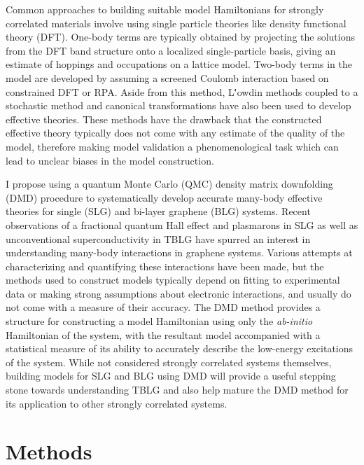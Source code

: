 \documentclass[12pt]{article}
\begin{document}
Common approaches to building suitable model Hamiltonians for strongly correlated materials involve using single particle theories like density functional theory (DFT).
One-body terms are typically obtained by projecting the solutions from the DFT band structure onto a localized single-particle basis, giving an estimate of hoppings and occupations on a lattice model.
Two-body terms in the model are developed by assuming a screened Coulomb interaction based on constrained DFT or RPA.
Aside from this method, L\''{o}wdin methods coupled to a stochastic method and canonical transformations have also been used to develop effective theories.
These methods have the drawback that the constructed effective theory typically does not come with any estimate of the quality of the model, therefore making model validation a phenomenological task which can lead to unclear biases in the model construction.

I propose using a quantum Monte Carlo (QMC) density matrix downfolding (DMD) procedure to systematically develop accurate many-body effective theories for single (SLG) and bi-layer graphene (BLG) systems.
Recent observations of a fractional quantum Hall effect and plasmarons in SLG as well as unconventional superconductivity in TBLG have spurred an interest in understanding many-body interactions in graphene systems.
Various attempts at characterizing and quantifying these interactions have been made, but the methods used to construct models typically depend on fitting to experimental data or making strong assumptions about electronic interactions, and usually do not come with a measure of their accuracy.
The DMD method provides a structure for constructing a model Hamiltonian using only the \textit{ab-initio} Hamiltonian of the system, with the resultant model accompanied with a statistical measure of its ability to accurately describe the low-energy excitations of the system.
While not considered strongly correlated systems themselves, building models for SLG and BLG using DMD will provide a useful stepping stone towards understanding TBLG and also help mature the DMD method for its application to other strongly correlated systems.

\section{Methods}
\end{document}
